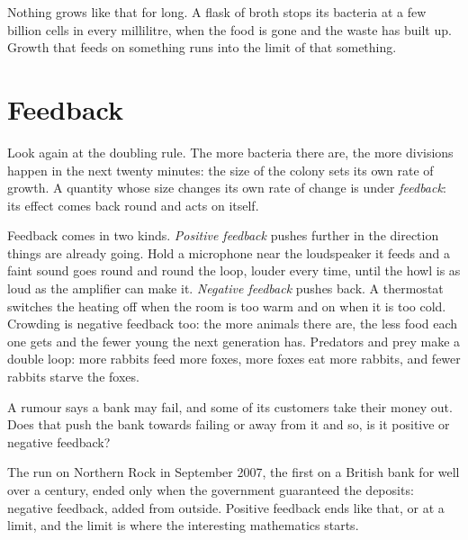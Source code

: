 Nothing grows like that for long. A flask of broth stops its bacteria at a
few billion cells in every millilitre, when the food is gone and the waste
has built up. Growth that feeds on something runs into the limit of that
something.

\section{Feedback}
\label{sec:ch03-feedback}

\noindent
Look again at the doubling rule. The more bacteria there are, the more
divisions happen in the next twenty minutes: the size of the colony sets
its own rate of growth. A quantity whose size changes its own rate of change
is under \emph{feedback}: its effect comes back round and acts on itself.

Feedback comes in two kinds. \emph{Positive feedback} pushes further in the
direction things are already going. Hold a microphone near the loudspeaker
it feeds and a faint sound goes round and round the loop, louder every
time, until the howl is as loud as the amplifier can make it.
\emph{Negative feedback} pushes back. A thermostat switches the heating off
when the room is too warm and on when it is too cold. Crowding is
negative feedback too: the more animals there are, the less food each one
gets and the fewer young the next generation has. Predators and prey make a
double loop: more rabbits feed more foxes, more foxes eat more rabbits, and
fewer rabbits starve the foxes.


\begin{think}
A rumour says a bank may fail, and some of its customers take their money
out. Does that push the bank towards failing or away from it \dash{} and so,
is it positive or negative feedback?
\end{think}
The run on Northern Rock in September 2007, the first on a British bank for
well over a century, ended only when the government guaranteed the deposits:
negative feedback, added from outside. Positive feedback ends like that, or
at a limit, and the limit is where the interesting mathematics starts.

